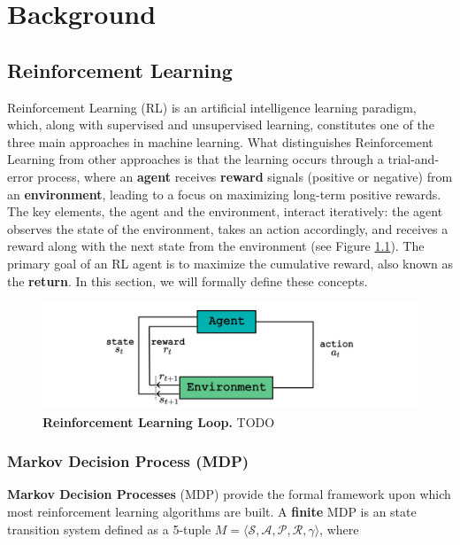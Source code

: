 
\chapter{Background}

\section{Reinforcement Learning}

Reinforcement Learning (RL) \cite{sutton2018reinforcement} is an artificial intelligence learning paradigm, which, along with supervised and unsupervised learning, constitutes one of the three main approaches in machine learning. What distinguishes Reinforcement Learning from other approaches is that the learning occurs through a trial-and-error process, where an \textbf{agent} receives \textbf{reward} signals (positive or negative) from an \textbf{environment}, leading to a focus on maximizing long-term positive rewards. The key elements, the agent and the environment, interact iteratively: the agent observes the state of the environment, takes an action accordingly, and receives a reward along with the next state from the environment (see Figure \ref{fig:rl_loop}). The primary goal of an RL agent is to maximize the cumulative reward, also known as the \textbf{return}. In this section, we will formally define these concepts.

\begin{figure}[H]
    \centering
    \includegraphics[width=1\linewidth]{Figures/rl_loop.jpg}
    \caption[Reinforcement Learning Loop]{\textbf{Reinforcement Learning Loop.} TODO}
    \label{fig:rl_loop}
\end{figure}

\subsection{Markov Decision Process (MDP)}
\label{sec:mdp_definition}

\textbf{Markov Decision Processes} (MDP) provide the formal framework upon which most reinforcement learning algorithms are built. A \textbf{finite} MDP is an state transition system defined as a 5-tuple $M = \langle \mathcal{S}, \mathcal{A}, \mathcal{P}, \mathcal{R}, \gamma \rangle$, where 

